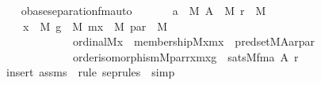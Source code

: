 \begin{isabellebody}
\ \ \isamarkupfalse%
%
\endisatagproof
{\isafoldproof}%
%
\isadelimproof
\isanewline
%
\endisadelimproof
\isanewline
{}\isamarkupfalse%
\ obase{\isacharunderscore}{\kern0pt}separation{\isacharunderscore}{\kern0pt}fm{\isacharunderscore}{\kern0pt}auto{\isacharcolon}{\kern0pt}\isanewline
\ \ \isanewline
\ \ \ \ {\isachardoublequoteopen}a\ {\isasymin}\ M{\isachardoublequoteclose}\ {\isachardoublequoteopen}A\ {\isasymin}\ M{\isachardoublequoteclose}\ {\isachardoublequoteopen}r\ {\isasymin}\ M{\isachardoublequoteclose}\ \isanewline
\ \ \isanewline
\ \ \ \ {\isachardoublequoteopen}{\isacharparenleft}{\kern0pt}{\isasymexists}x\ {\isasymin}\ M{\isachardot}{\kern0pt}\ {\isasymexists}g\ {\isasymin}\ M{\isachardot}{\kern0pt}\ {\isasymexists}mx\ {\isasymin}\ M{\isachardot}{\kern0pt}\ {\isasymexists}par\ {\isasymin}\ M{\isachardot}{\kern0pt}\isanewline
\ \ \ \ \ \ \ \ \ \ \ \ \ ordinal{\isacharparenleft}{\kern0pt}{\isacharhash}{\kern0pt}{\isacharhash}{\kern0pt}M{\isacharcomma}{\kern0pt}x{\isacharparenright}{\kern0pt}\ {\isasymand}\ membership{\isacharparenleft}{\kern0pt}{\isacharhash}{\kern0pt}{\isacharhash}{\kern0pt}M{\isacharcomma}{\kern0pt}x{\isacharcomma}{\kern0pt}mx{\isacharparenright}{\kern0pt}\ {\isasymand}\ pred{\isacharunderscore}{\kern0pt}set{\isacharparenleft}{\kern0pt}{\isacharhash}{\kern0pt}{\isacharhash}{\kern0pt}M{\isacharcomma}{\kern0pt}A{\isacharcomma}{\kern0pt}a{\isacharcomma}{\kern0pt}r{\isacharcomma}{\kern0pt}par{\isacharparenright}{\kern0pt}\ {\isasymand}\isanewline
\ \ \ \ \ \ \ \ \ \ \ \ \ order{\isacharunderscore}{\kern0pt}isomorphism{\isacharparenleft}{\kern0pt}{\isacharhash}{\kern0pt}{\isacharhash}{\kern0pt}M{\isacharcomma}{\kern0pt}par{\isacharcomma}{\kern0pt}r{\isacharcomma}{\kern0pt}x{\isacharcomma}{\kern0pt}mx{\isacharcomma}{\kern0pt}g{\isacharparenright}{\kern0pt}{\isacharparenright}{\kern0pt}\ {\isasymlongleftrightarrow}\ sats{\isacharparenleft}{\kern0pt}M{\isacharcomma}{\kern0pt}{\isacharquery}{\kern0pt}fm{\isacharcomma}{\kern0pt}{\isacharbrackleft}{\kern0pt}a{\isacharcomma}{\kern0pt}\ A{\isacharcomma}{\kern0pt}\ r{\isacharbrackright}{\kern0pt}{\isacharparenright}{\kern0pt}{\isachardoublequoteclose}\ \isanewline
%
\isadelimproof
\ \ %
\endisadelimproof
%
\isatagproof
{}\isamarkupfalse%
\ {\isacharparenleft}{\kern0pt}insert\ assms\ {\isacharsemicolon}{\kern0pt}\ {\isacharparenleft}{\kern0pt}rule\ sep{\isacharunderscore}{\kern0pt}rules\ {\isacharbar}{\kern0pt}\ simp{\isacharparenright}{\kern0pt}{\isacharplus}{\kern0pt}{\isacharparenright}{\kern0pt}%

\end{isabellebody}
